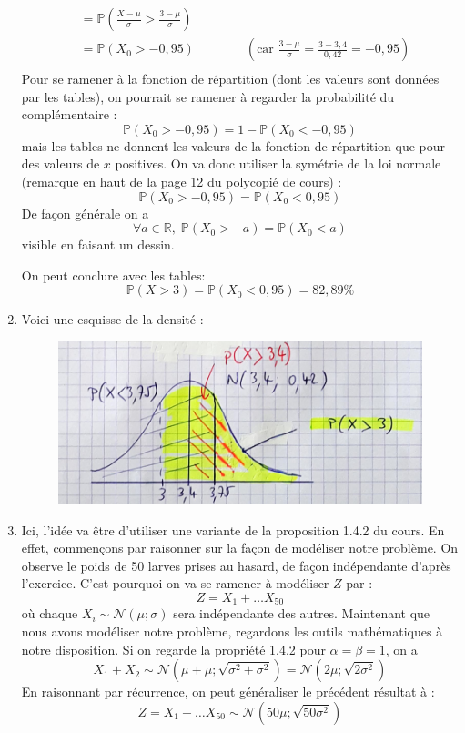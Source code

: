 \documentclass[a4paper,oneside,12pt]{article}
\theoremstyle{plain}
\def\R{{\mathbb R}}
\def\P{{\mathbb P}}
\begin{document}
\begin{enumerate}
\begin{align*}
        &=\P\left(\frac{X-\mu}{\sigma}>\frac{3-\mu}{\sigma}\right)\\
        &=\P(X_0>-0,95) \qquad \qquad \left( \mbox{car } \frac{3-\mu}{\sigma} = \frac{3-3,4}{0,42} =- 0,95\right)\\
    \end{align*}
    Pour se ramener à la fonction de répartition (dont les valeurs sont données par les tables), on pourrait se ramener à regarder la probabilité du complémentaire :$$ \P(X_0>-0,95) = 1 - \P(X_0<-0,95)$$
    mais les tables ne donnent les valeurs de la fonction de répartition que pour des valeurs de $x$ positives. On va donc utiliser la symétrie de la loi normale (remarque en haut de la page 12 du polycopié de cours) :
    $$\P(X_0>-0,95) = \P(X_0<0,95)$$
    De façon générale on a $$\forall a \in \R,\; \P(X_0>-a) = \P(X_0<a)$$
    visible en faisant un dessin.
    
    On peut conclure avec les tables:
    $$\P(X>3) = \P(X_0<0,95) = 82,89\%$$
    
    \item Voici une esquisse de la densité :
    \begin{figure}[h]
    \centering
    \includegraphics[width = \textwidth]{images/question_5.png}
\end{figure}

    \item Ici, l'idée va être d'utiliser une variante de la proposition 1.4.2 du cours. En effet, commençons par raisonner sur la façon de modéliser notre problème. On observe le poids de 50 larves prises au hasard, de façon indépendante d'après l'exercice. C'est pourquoi on va se ramener à modéliser $Z$ par :
    $$Z = X_1 + \dots X_{50}$$ 
    où chaque $X_i \sim \mathcal{N}(\mu; \sigma)$ sera indépendante des autres.
    Maintenant que nous avons modéliser notre problème, regardons les outils mathématiques à notre disposition. Si on regarde la propriété 1.4.2 pour $\alpha = \beta = 1$, on a 
    $$X_1 + X_2 \sim \mathcal{N}(\mu +\mu; \sqrt{\sigma^2 + \sigma^2}) =\mathcal{N}(2\mu; \sqrt{2\sigma^2}) $$
    En raisonnant par récurrence, on peut généraliser le précédent résultat à :
    $$Z = X_1 + \dots X_{50} \sim\mathcal{N}(50\mu; \sqrt{50\sigma^2})$$
    



\end{enumerate}
\end{document}
